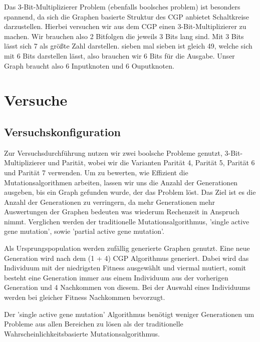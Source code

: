 Das 3-Bit-Multiplizierer Problem (ebenfalls boolsches problem) ist besonders spannend, da sich die Graphen basierte Struktur des CGP anbietet Schaltkreise darzustellen. Hierbei versuchen wir aus dem CGP einen 3-Bit-Multiplizierer zu machen. Wir brauchen also 2 Bitfolgen die jeweils 3 Bits lang sind. Mit 3 Bits lässt sich 7 als größte Zahl darstellen. sieben mal sieben ist gleich 49, welche sich mit 6 Bits darstellen lässt, also brauchen wir 6 Bits für die Ausgabe. Unser Graph braucht also 6 Inputknoten und 6 Ouputknoten.

\chapter{Versuche}


\section{Versuchskonfiguration}

Zur Versuchsdurchführung nutzen wir zwei boolsche Probleme genutzt, 3-Bit-Multiplizierer und Parität, wobei wir die Varianten Parität 4, Parität 5, Parität 6 und Parität 7 verwenden. Um zu bewerten, wie Effizient die Mutationsalgorithmen arbeiten, lassen wir uns die Anzahl der Generationen ausgeben, bis ein Graph gefunden wurde, der das Problem löst. Das Ziel ist es die Anzahl der Generationen zu verringern, da mehr Generationen mehr Auswertungen der Graphen bedeuten was wiederum Rechenzeit in Anspruch nimmt. Verglichen werden der traditionelle Mutationsalgorithmus, 'single active gene mutation', sowie 'partial active gene mutation'.

Als Ursprungspopulation werden zufällig generierte Graphen genutzt. Eine neue Generation wird nach dem (1 + 4) CGP Algorithmus generiert. Dabei wird das Individuum mit der niedrigsten Fitness ausgewählt und viermal mutiert, somit besteht eine Generation immer aus einem Individuum aus der vorherigen Generation und 4 Nachkommen von diesem. Bei der Auswahl eines Individuums werden bei gleicher Fitness Nachkommen bevorzugt.

\begin{hypothesis}
Der 'single active gene mutation' Algorithmus benötigt weniger Generationen um Probleme aus allen Bereichen zu lösen als der traditionelle Wahrscheinlichkeitsbasierte Mutationsalgorithmus.
\end{hypothesis}

